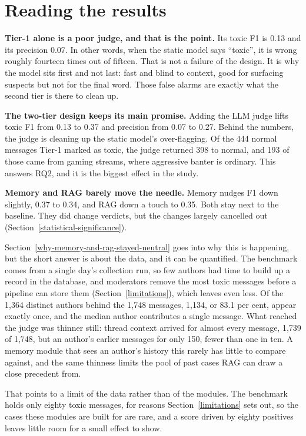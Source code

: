 \section{Reading the results}\label{reading-the-results}

\textbf{Tier-1 alone is a poor judge, and that is the point.} Its toxic F1 is 0.13 and its precision 0.07. In other words, when the static model says ``toxic'', it is wrong roughly fourteen times out of fifteen. That is not a failure of the design. It is why the model sits first and not last: fast and blind to context, good for surfacing suspects but not for the final word. Those false alarms are exactly what the second tier is there to clean up.

\textbf{The two-tier design keeps its main promise.} Adding the LLM judge lifts toxic F1 from 0.13 to 0.37 and precision from 0.07 to 0.27. Behind the numbers, the judge is cleaning up the static model's over-flagging. Of the 444 normal messages Tier-1 marked as toxic, the judge returned 398 to normal, and 193 of those came from gaming streams, where aggressive banter is ordinary. This answers RQ2, and it is the biggest effect in the study.

\textbf{Memory and RAG barely move the needle.} Memory nudges F1 down slightly, 0.37 to 0.34, and RAG down a touch to 0.35. Both stay next to the baseline. They did change verdicts, but the changes largely cancelled out (Section~\ref{statistical-significance}).

Section~\ref{why-memory-and-rag-stayed-neutral} goes into why this is happening, but the short answer is about the data, and it can be quantified. The benchmark comes from a single day's collection run, so few authors had time to build up a record in the database, and moderators remove the most toxic messages before a pipeline can store them (Section~\ref{limitations}), which leaves even less. Of the 1,364 distinct authors behind the 1,748 messages, 1,134, or 83.1 per cent, appear exactly once, and the median author contributes a single message. What reached the judge was thinner still: thread context arrived for almost every message, 1,739 of 1,748, but an author's earlier messages for only 150, fewer than one in ten. A memory module that sees an author's history this rarely has little to compare against, and the same thinness limits the pool of past cases RAG can draw a close precedent from.

That points to a limit of the data rather than of the modules. The benchmark holds only eighty toxic messages, for reasons Section~\ref{limitations} sets out, so the cases these modules are built for are rare, and a score driven by eighty positives leaves little room for a small effect to show.


